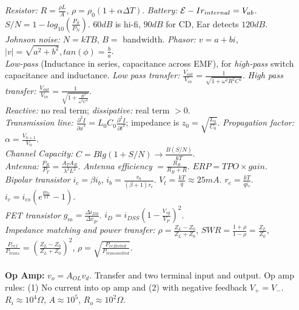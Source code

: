 \emph{Resistor:} $R= {\frac {\rho L} A}$, $\rho= \rho_0(1+ \alpha \Delta T)$.
\emph{Battery:} ${\cal E} - Ir_{internal}= V_{ab}$. \\
$S/N= 1- log_{10}({\frac {P_S} {P_N}})$.  $60 dB$ is hi-fi, $90 dB$ for CD, Ear
detects $120 dB$. \\
\emph{Johnson noise:} $N=kTB$, $B=$ bandwidth.
\emph{Phasor:} $v=a+bi$, $|v|= \sqrt{a^2+b^2}, tan(\phi)= {\frac b a}$. \\
\emph{Low-pass} (Inductance in series, capacitance across EMF), 
for \emph{high-pass} switch capacitance and inductance. 
\emph{Low pass transfer:} ${\frac {V_{out}} {V_{in}}} = {\frac 1 {\sqrt{1+ \omega^2 R^2 C^2}}}$.
\emph{High pass transfer:} 
${\frac {V_{out}} {V_{in}}} = {\frac 1 {\sqrt{1+ {\frac {R^2} {\omega^2 C^2}}}}}$. \\
\emph{Reactive:} no real term;
\emph{dissipative:} real term $>0$.  \\
\emph{Transmission line:}
${\frac {\partial^2 I} {{\partial x}^2}} = L_0 C_0 {\frac {\partial^2 I} {{\partial t}^2}}$;
impedance is $z_0 = {\sqrt {\frac {L_0} {C_0}}}$.
\emph{Propagation factor:}
$\alpha= {\frac {V_{n+1}} {V_n}}$.  \\
\emph{Channel Capacity:} $C= B lg(1+S/N) \rightarrow {\frac {B (S/N)} {kT}}$. \\
\emph{Antenna:} ${\frac {P_R} {P_T}}= {\frac {A_T A_R} {\lambda^2 L^2}}$.
\emph{Antenna efficiency} $= {\frac {R_R} {R_R+R}}$.
$ERP= TPO \times gain$.\\
\emph{Bipolar transistor} $i_c= \beta i_b$, $i_b = {\frac {v_b}{(\beta + 1)r_e}}$. 
$V_t= {\frac {kT}q} \approx 25mA$.  $r_e= {\frac {kT}{q i_c}}$.
$i_c= i_{cs} (e^{\frac {qv_{be}} {kT}} -1)$.
\\
\emph{FET transistor} $g_m = {\frac {\Delta i_{DS}} {\Delta v_{gs}}}$.  $i_D = i_{DSS} (1-{\frac {V_{sg}} {V_P}})^2$.
\\
\emph{Impedance matching and power transfer:}
$\rho={\frac {Z_L-Z_0} {Z_L+Z_0}}$, 
$SWR= {\frac {1+\rho} {1-\rho}}= {\frac {Z_L}{Z_0}}$,
${\frac {P_{ref}} {P_{trans}}}= ({\frac {Z_L-Z_0} {Z_L+Z_0}})^2$,
$\rho= {\sqrt {\frac {P_{reflected}} {P_{transmitted}}}}$.
\\
\\
{\bf Op Amp:} $ v_o= A_{OL}v_d$.  Transfer and two terminal input and output.
Op amp rules: (1) No current into op amp and
(2) with negative feedback $V_+ = V_-$.
$R_i \approx 10^4 \Omega$, $A \approx 10^5$, $R_o \approx 10^2 \Omega$.    
\\
\\
